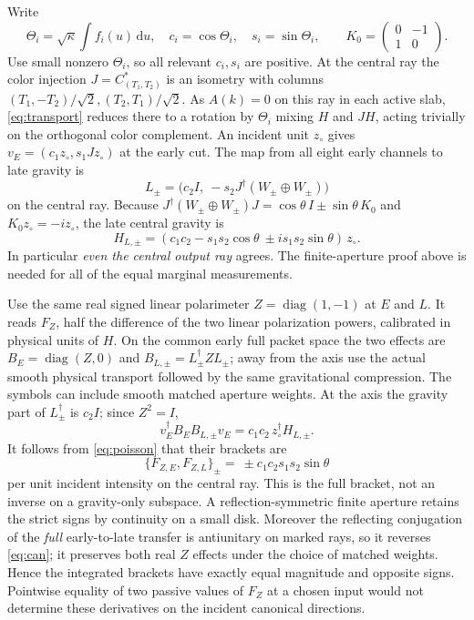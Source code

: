 \documentclass[11pt]{article}
\newcommand{\dd}{\mathrm d}
\begin{document}
Write
\[
 \Theta_i=\sqrt\kappa\int f_i(u)\,\dd u,\quad
 c_i=\cos\Theta_i,\quad s_i=\sin\Theta_i,\qquad
 K_0=\begin{pmatrix}0&-1\\1&0\end{pmatrix}.
\]
Use small nonzero \(\Theta_i\), so all relevant \(c_i,s_i\)
are positive. At the central ray the color injection
\(J=C^*_{(T_1,T_2)}\) is an isometry with columns
\((T_1,-T_2)/\sqrt2,(T_2,T_1)/\sqrt2\).
As \(A(k)=0\) on this ray in each active slab,
\eqref{eq:transport} reduces there to a rotation
by \(\Theta_i\) mixing \(H\) and \(JH\), acting
trivially on the orthogonal color complement.
An incident unit \(z_\circ\) gives
\(v_E=(c_1z_\circ,s_1Jz_\circ)\) at the early cut.
The map from all eight early channels to late
gravity is
\[
 L_\pm=\big(c_2 I,\ -s_2J^\dagger(W_\pm\oplus W_\pm)\big)
\]
on the central ray. Because
\(J^\dagger(W_\pm\oplus W_\pm)J
      =\cos\theta\,I\pm\sin\theta\,K_0\) and
\(K_0z_\circ=-iz_\circ\), the late central gravity is
\begin{equation}\label{eq:late}
 H_{L,\pm}=(c_1c_2-s_1s_2\cos\theta
                       \ \pm i s_1s_2\sin\theta)\,z_\circ.
\end{equation}
In particular \emph{even the central output ray} agrees.
The finite-aperture proof above is needed for all of the
equal marginal measurements.

Use the same real signed linear polarimeter
\(Z=\operatorname{diag}(1,-1)\) at \(E\) and \(L\).
It reads \(F_Z\), half the difference of the two linear
polarization powers, calibrated in physical units of
\(H\). On the common early full packet space the two
effects are \(B_E=\operatorname{diag}(Z,0)\) and
\(B_{L,\pm}=L_\pm^\dagger Z L_\pm\); away from the axis
use the actual smooth physical transport followed by
the same gravitational compression. The symbols can
include smooth matched aperture weights. At the axis
the gravity part of \(L_\pm^\dagger\) is \(c_2I\);
since \(Z^2=I\),
\[
 v_E^\dagger B_E B_{L,\pm} v_E
        =c_1c_2\, z_\circ^\dagger H_{L,\pm}.
\]
It follows from \eqref{eq:poisson} that their brackets are
\begin{equation}\label{eq:witness}
 \{F_{Z,E},F_{Z,L}\}_{\pm}
       =\ \pm c_1c_2s_1s_2\sin\theta
\end{equation}
per unit incident intensity on the central ray. This is
the full bracket, not an inverse on a gravity-only
subspace. A reflection-symmetric finite aperture retains
the strict signs by continuity on a small disk.
Moreover the reflecting conjugation of the \emph{full}
early-to-late transfer is antiunitary on marked rays,
so it reverses \eqref{eq:can}; it preserves both real
\(Z\) effects under the choice of matched weights.
Hence the integrated brackets have exactly equal magnitude
and opposite signs. Pointwise equality of two passive
values of \(F_Z\) at a chosen input would not determine
these derivatives on the incident canonical directions.
\end{document}
